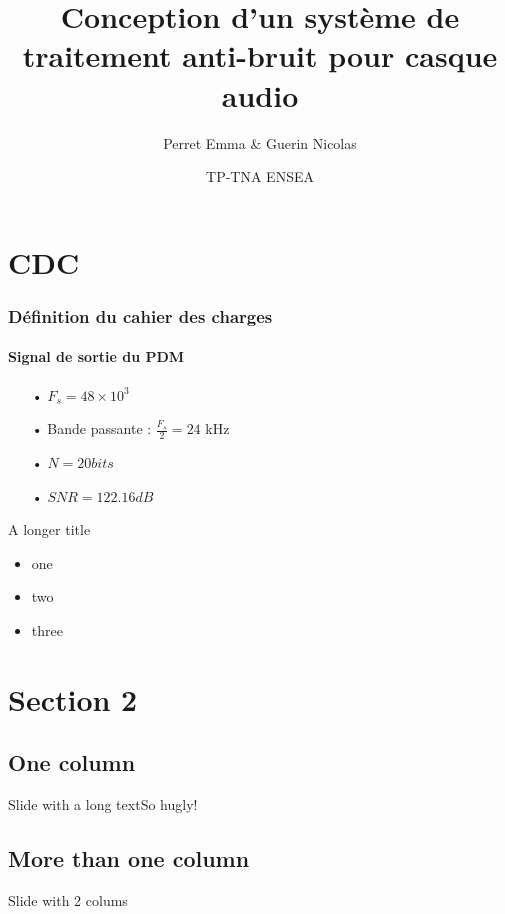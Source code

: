 \documentclass[
10pt,
aspectratio=169,
]{beamer}
\title{Conception d'un  système de traitement anti-bruit pour casque audio}
\subtitle{}
\date[26/11/2021]{TP-TNA ENSEA}
\author[PG]{Perret Emma \& Guerin Nicolas}
\begin{document}
\begin{frame}
\titlepage
\end{frame}

\section{CDC}
\begin{frame}{}
\frametitle{Définition du cahier des charges} 
\framesubtitle{Signal de sortie du PDM} 

\begin{enumerate} 
\item[•] $F_s=48 \times 10^{3}$
\item[•] Bande passante : $\frac{F_s}{2}= 24 $ kHz
\item[•] $N= 20 bits$ 
\item[•]$SNR = 122.16 dB$
\end{enumerate}
\end{frame}

\begin{frame}{A longer title}
\begin{itemize}
\item one
\item two
\item three
\end{itemize}
\end{frame}

\section{Section 2}
\subsection{One column}

\begin{frame}{Slide with a long text}{So hugly!}
\small
\lipsum[1-2]
\end{frame}

\subsection{More than one column}

\begin{frame}{Slide with 2 colums}
\begin{columns}[t]
  \begin{column}{.45\textwidth}
    \lipsum[2]
  \end{column}
  \begin{column}{.45\textwidth}
    \lipsum[2]
  \end{column}
\end{columns}
\end{frame}
\end{document}
